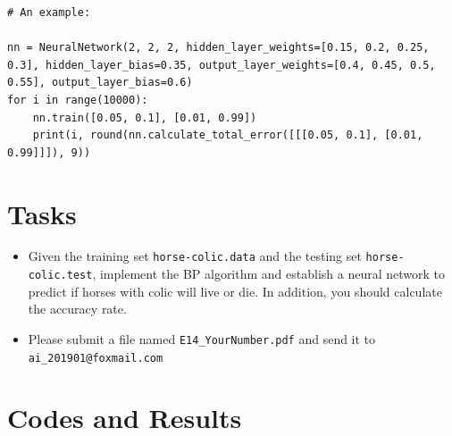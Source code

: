 \documentclass[a4paper, 11pt]{article}
\begin{document}
\begin{enumerate}
\begin{lstlisting}
# An example:

nn = NeuralNetwork(2, 2, 2, hidden_layer_weights=[0.15, 0.2, 0.25, 0.3], hidden_layer_bias=0.35, output_layer_weights=[0.4, 0.45, 0.5, 0.55], output_layer_bias=0.6)
for i in range(10000):
    nn.train([0.05, 0.1], [0.01, 0.99])
    print(i, round(nn.calculate_total_error([[[0.05, 0.1], [0.01, 0.99]]]), 9))
\end{lstlisting}

\end{enumerate}
\section{Tasks}
\begin{itemize}
	\item Given the training set \texttt{horse-colic.data} and the testing set \texttt{horse-colic.test}, implement the BP algorithm and establish a neural network to predict if horses with colic will live or die. In addition, you should calculate the accuracy rate.
	\item Please submit a file named \texttt{E14\_YourNumber.pdf} and send it to \texttt{ai\_201901@foxmail.com}
\end{itemize}

\section{Codes and Results}
\end{document}
